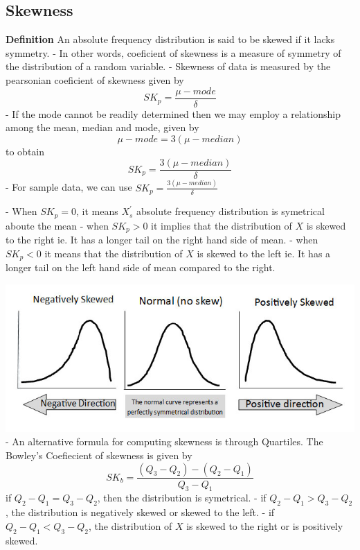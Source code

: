 \documentclass[12pt,a4paper]{article}
\begin{document}
\subsection{Skewness}
\textbf{Definition} An absolute frequency distribution is said to be skewed if it lacks symmetry.
- In other words, coeficient of skewness is a measure of symmetry of the distribution of a random variable.
- Skewness of data is measured by the pearsonian coeficient of skewness given by
\begin{equation}
    SK_p = \frac{\mu - mode}{\delta}
\end{equation}
- If the mode cannot be readily determined then we may employ a relationship among the mean, median and mode, given by
\begin{equation}
    \mu - mode = 3(\mu - median)
\end{equation}
to obtain
\begin{equation}
    SK_p = \frac{3(\mu - median)}{\delta}
\end{equation}
- For sample data, we can use $SK_p = \frac{3(\mu - median)}{\delta}$

- When $SK_p = 0$, it means $X_s^{'}$ absolute frequency distribution is symetrical aboute the mean
- when $SK_p > 0$ it implies that the distribution of $X$ is skewed to the right ie. It has a longer tail on the right hand side of mean.
- when $SK_p < 0$ it means that the distribution of $X$ is skewed to the left ie. It has a longer tail on the left hand side of mean compared to the right.

\hbox{\includegraphics[width=\textwidth]{measure-of-skewness.jpg}}
- An alternative formula for computing skewness is through Quartiles. The Bowley's Coefiecient of skewness is given by
\begin{equation}
    SK_b = \frac{(Q_3 - Q_2)-(Q_2 - Q_1)}{Q_3 - Q_1}
\end{equation}
if $Q_2 - Q_1 = Q_3 - Q_2$, then the distribution is symetrical.
- if $Q_2 - Q_1 > Q_3 - Q_2$, the distribution is negatively skewed or skewed to the left.
- if $Q_2 - Q_1 < Q_3 - Q_2$, the distribution of $X$ is skewed to the right or is positively skewed.
\end{document}
